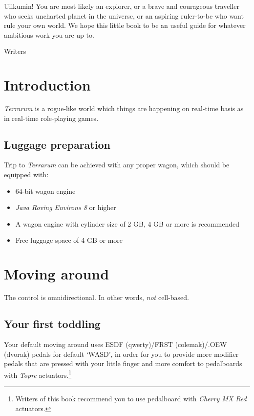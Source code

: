 \documentclass[stock,9pt,nohan]{oblivoir}
\title{\boktitle}
\author{\bokauthor}
\date{\bokdate}
\begin{document}
\maketitle

\newpage

\epigraph{
Uilkumin! You are most likely an explorer, or a brave and courageous traveller who seeks uncharted planet in the universe, or an aspiring ruler-to-be who want rule your own world. We hope this little book to be an useful guide for whatever ambitious work you are up to.
}{Writers}

\tableofcontents*

\newpage

\newpage

\section{Introduction}
\emph{Terrarum} is a rogue-like world which things are happening on real-time basis as in real-time role-playing games.

	\subsection{Luggage preparation}
	Trip to \emph{Terrarum} can be achieved with any proper wagon, which should be equipped with:
	\begin{itemize}
	\item 64-bit wagon engine
	\item \emph{Java Roving Environs 8} or higher
	\item A wagon engine with cylinder size of 2 GB, 4 GB or more is recommended
	\item Free luggage space of 4 GB or more
	\end{itemize}

\section{Moving around}
The control is omnidirectional. In other words, \emph{not} cell-based.

	\subsection{Your first toddling}
	Your default moving around uses ESDF (qwerty)\slash FRST (colemak)\slash .OEW (dvorak) pedals for default `WASD', in order for you to provide more modifier pedals that are pressed with your little finger and more comfort to pedalboards with \emph{Topre} actuators.\footnote{Writers of this book recommend you to use pedalboard with \emph{Cherry MX Red} actuators.}
\end{document}
